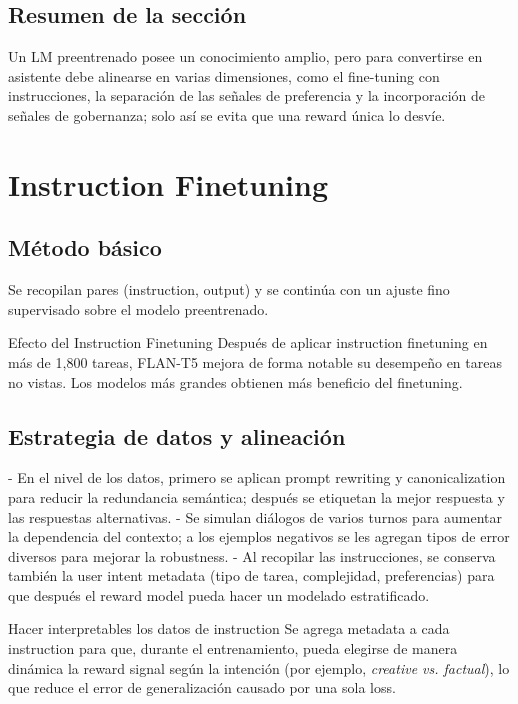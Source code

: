 \documentclass[a4paper]{article}
\begin{document}
\subsection{Resumen de la sección}

Un LM preentrenado posee un conocimiento amplio, pero para convertirse en asistente debe alinearse en varias dimensiones, como el fine-tuning con instrucciones, la separación de las señales de preferencia y la incorporación de señales de gobernanza; solo así se evita que una reward única lo desvíe.
\section{Instruction Finetuning}

\subsection{Método básico}

Se recopilan pares (instruction, output) y se continúa con un ajuste fino supervisado sobre el modelo preentrenado.

\begin{importantbox}{Efecto del Instruction Finetuning}
Después de aplicar instruction finetuning en más de 1,800 tareas, FLAN-T5 mejora de forma notable su desempeño en tareas no vistas. Los modelos más grandes obtienen más beneficio del finetuning.
\end{importantbox}

\subsection{Estrategia de datos y alineación}

- En el nivel de los datos, primero se aplican prompt rewriting y canonicalization para reducir la redundancia semántica; después se etiquetan la mejor respuesta y las respuestas alternativas.
- Se simulan diálogos de varios turnos para aumentar la dependencia del contexto; a los ejemplos negativos se les agregan tipos de error diversos para mejorar la robustness.
- Al recopilar las instrucciones, se conserva también la user intent metadata (tipo de tarea, complejidad, preferencias) para que después el reward model pueda hacer un modelado estratificado.

\begin{knowledgebox}{Hacer interpretables los datos de instruction}
Se agrega metadata a cada instruction para que, durante el entrenamiento, pueda elegirse de manera dinámica la reward signal según la intención (por ejemplo, \textit{creative vs. factual}), lo que reduce el error de generalización causado por una sola loss.
\end{knowledgebox}
\end{document}
